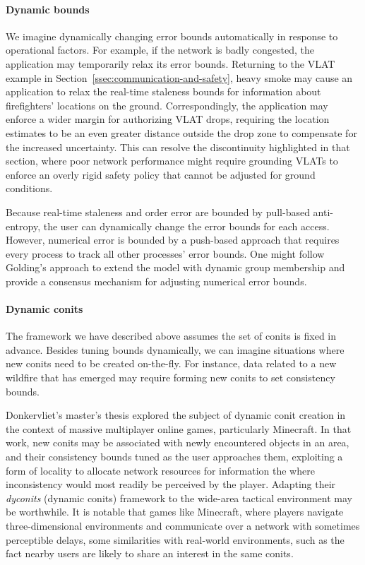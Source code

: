 \documentclass[]             %
{NASA}                       %
\theoremstyle{definition}
\begin{document}
\paragraph{Dynamic bounds}
We imagine dynamically changing error bounds automatically in response
to operational factors. For example, if the network is badly
congested, the application may temporarily relax its error
bounds. Returning to the VLAT example in
Section~\ref{ssec:communication-and-safety}, heavy smoke may cause an
application to relax the real-time staleness bounds for information
about firefighters' locations on the ground. Correspondingly, the
application may enforce a wider margin for authorizing VLAT drops,
requiring the location estimates to be an even greater distance
outside the drop zone to compensate for the increased
uncertainty. This can resolve the discontinuity highlighted in that
section, where poor network performance might require grounding VLATs
to enforce an overly rigid safety policy that cannot be adjusted for
ground conditions.

Because real-time staleness and order error are bounded by pull-based
anti-entropy, the user can dynamically change the error bounds for
each access. However, numerical error is bounded by a push-based
approach that requires every process to track all other processes'
error bounds. One might follow Golding's approach
\cite{1992:golding-thesis} to extend the model with dynamic group
membership and provide a consensus mechanism for adjusting numerical
error bounds.

\paragraph{Dynamic conits}
The framework we have described above assumes the set of conits is
fixed in advance. Besides tuning bounds dynamically, we can imagine
situations where new conits need to be created on-the-fly. For
instance, data related to a new wildfire that has emerged may require
forming new conits to set consistency bounds.

Donkervliet's master's thesis \cite{dyconits} explored the subject of
dynamic conit creation in the context of massive multiplayer online
games, particularly Minecraft. In that work, new conits may be
associated with newly encountered objects in an area, and their
consistency bounds tuned as the user approaches them, exploiting a
form of locality to allocate network resources for information the
where inconsistency would most readily be perceived by the
player. Adapting their \emph{dyconits} (dynamic conits) framework to
the wide-area tactical environment may be worthwhile. It is notable
that games like Minecraft, where players navigate three-dimensional
environments and communicate over a network with sometimes perceptible
delays, some similarities with real-world environments, such as the
fact nearby users are likely to share an interest in the same conits.
\end{document}
